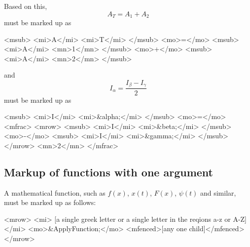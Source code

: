 \documentclass[english,a4paper,11pt]{article}
\begin{document}
\begin{eksempler}
Based on this,
	\[ A_T = A_1 + A_2 \]
	must be marked up as
\begin{kodeblokk}
\begin{verbatimtab}[3]
<msub>
	<mi>A</mi>
	<mi>T</mi>
</msub>
<mo>=</mo>
<msub>
	<mi>A</mi>
	<mn>1</mn>
</msub>
<mo>+</mo>
<msub>
	<mi>A</mi>
	<mn>2</mn>
</msub>
\end{verbatimtab}
\end{kodeblokk}
and
	\[ I_\alpha = \frac{I_\beta - I_\gamma}{2} \]
must be marked up as
\begin{kodeblokk}
\begin{verbatimtab}[3]
<msub>
	<mi>I</mi>
	<mi>&alpha;</mi>
</msub>
<mo>=</mo>
<mfrac>
	<mrow>
		<msub>
			<mi>I</mi>
			<mi>&beta;</mi>
		</msub>
		<mo>-</mo>
		<msub>
			<mi>I</mi>
			<mi>&gamma;</mi>
		</msub>
	</mrow>
	<mn>2</mn>
</mfrac>
\end{verbatimtab}
\end{kodeblokk}
	
\end{eksempler}


\innholdNyttBlokkSlutt
\subsection{Markup of functions with one argument}
A mathematical function, such as $f(x)$, $x(t)$, $F(x)$, $\psi (t)$ and similar, must be marked up as follows:
\begin{kodeblokk}
	\begin{verbatimtab}[3]
<mrow>
	<mi>
		[a single greek letter 
		or 
		a single letter in the reqions a-z or A-Z]
	</mi>
	<mo>&ApplyFunction;</mo>
	<mfenced>[any one child]</mfenced>
</mrow>
	\end{verbatimtab}
\end{kodeblokk}
\end{document}
